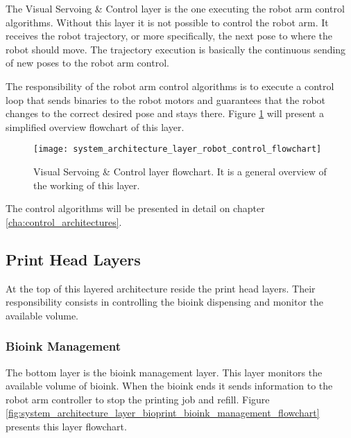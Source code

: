 The Visual Servoing \& Control layer is the one executing the robot arm control algorithms. Without this layer it is not possible to control the robot arm. It receives the robot trajectory, or more specifically, the next pose to where the robot should move. The trajectory execution is basically the continuous sending of new poses to the robot arm control.

The responsibility of the robot arm control algorithms is to execute a control loop that sends binaries to the robot motors and guarantees that the robot changes to the correct desired pose and stays there. Figure \ref{fig:system_architecture_layer_robot_control_flowchart} will present a simplified overview flowchart of this layer.

\begin{figure}[htbp]
	\centering
	\texttt{[image: system\_architecture\_layer\_robot\_control\_flowchart]}
	\caption{Visual Servoing & Control layer flowchart. It is a general overview of the working of this layer.}
	\label{fig:system_architecture_layer_robot_control_flowchart}
\end{figure}

The control algorithms will be presented in detail on chapter \ref{cha:control_architectures}.



\subsection{Print Head Layers}
\label{subsec:system_architectural_printhead_layers}

At the top of this layered architecture reside the print head layers. Their responsibility consists in controlling the bioink dispensing and monitor the available volume.

\subsubsection*{Bioink Management}
\label{subsubsec:system_architectural_printhead_layers_bioink_management}

The bottom layer is the bioink management layer. This layer monitors the available volume of bioink. When the bioink ends it sends information to the robot arm controller to stop the printing job and refill. Figure \ref{fig:system_architecture_layer_bioprint_bioink_management_flowchart} presents this layer flowchart.

